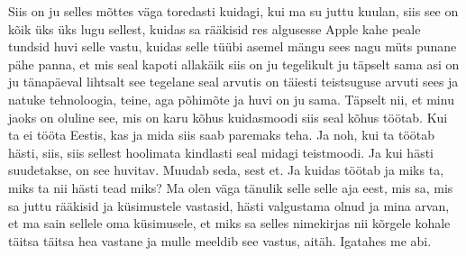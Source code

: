 Siis on ju selles mõttes väga toredasti kuidagi, kui ma su juttu kuulan, siis see on kõik üks üks lugu sellest, kuidas sa rääkisid res algusesse Apple kahe peale tundsid huvi selle vastu, kuidas selle tüübi asemel mängu sees nagu müts punane pähe panna, et mis seal kapoti allakäik siis on ju tegelikult ju täpselt sama asi on ju tänapäeval lihtsalt see tegelane seal arvutis on täiesti teistsuguse arvuti sees ja natuke tehnoloogia, teine, aga põhimõte ja huvi on ju sama.
Täpselt nii, et minu jaoks on oluline see, mis on karu kõhus kuidasmoodi siis seal kõhus töötab. Kui ta ei tööta Eestis, kas ja mida siis saab paremaks teha. Ja noh, kui ta töötab hästi, siis, siis sellest hoolimata kindlasti seal midagi teistmoodi.
Ja kui hästi suudetakse, on see huvitav. Muudab seda, sest et.
Ja kuidas töötab ja miks ta, miks ta nii hästi tead miks?
Ma olen väga tänulik selle selle aja eest, mis sa, mis sa juttu rääkisid ja küsimustele vastasid, hästi valgustama olnud ja mina arvan, et ma sain sellele oma küsimusele, et miks sa selles nimekirjas nii kõrgele kohale täitsa täitsa hea vastane ja mulle meeldib see vastus, aitäh.
Igatahes me abi.
